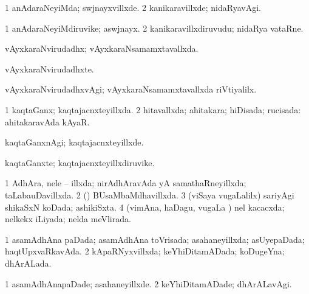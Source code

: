 {\bentry
{} 
\gl{\kirxvi}
\expl{}
\bmng
\bnum
\num{1} anAdaraNeyiMda; swjnayxvillxde. 
\num{2} kanikaravillxde; nidaRyavAgi. 
\enum
\emng
\eentry

\bentry
{} 
\gl{\nA}
\expl{}
\bmng
\bnum
\num{1} anAdaraNeyiMdiruvike; aswjnayx. 
\num{2} kanikaravillxdiruvudu; nidaRya vataRne. 
\enum
\emng
\eentry

\bentry
{} 
\gl{\gu}
\expl{}
\bmng
 vAyxkaraNvirudadhx; vAyxkaraNsamamxtavallxda. 
\emng
\eentry

\bentry
{} 
\gl{\nA}
\expl{}
\bmng
 vAyxkaraNvirudadhxte. 
\emng
\eentry

\bentry
{} 
\gl{\kirxvi}
\expl{}
\bmng
 vAyxkaraNvirudadhxvAgi; vAyxkaraNsamamxtavallxda riVtiyalilx. 
\emng
\eentry

\bentry
{} 
\gl{\nA}
\expl{}
\bmng
\emng
\eentry

\bentry
{} 
\gl{\gu}
\expl{}
\bmng
\bnum
\num{1} kaqtaGanx; kaqtajacnxteyillxda. 
\num{2} hitavallxda; ahitakara; hiDisada; rucisada:  ahitakaravAda kAyaR. 
\enum
\emng
\eentry

\bentry
{} 
\gl{\kirxvi}
\expl{}
\bmng
 kaqtaGanxnAgi; kaqtajacnxteyillxde. 
\emng
\eentry

\bentry
{} 
\gl{\nA}
\expl{}
\bmng
 kaqtaGanxte; kaqtajacnxteyillxdiruvike. 
\emng
\eentry

\bentry
{} 
\gl{\gu}
\expl{}
\bmng
\bnum
\num{1} AdhAra, nele -- illxda; nirAdhAravAda yA samathaRneyillxda; taLabauDavillxda. 
\num{2} (\viduyx) BUsaMbaMdhavillxda. 
\num{3} (viSaya \mo vugaLalilx) sariyAgi shikaSxN koDada; ashikiSxta. 
\num{4} (vimAna, haDagu, \mo vugaLa \vi) nel kacacxda; nelkekx iLiyada; nelda meVlirada. 
\enum
\emng
\eentry

\bentry
{} 
\gl{\gu}
\expl{}
\bmng
\bnum
\num{1} asamAdhAna paDada; asamAdhAna toVrisada; asahaneyillxda; asUyepaDada; haqtUpxvaRkavAda. 
\num{2} kApaRNyxvillxda; keYhiDitamADada; koDugeYna; dhArALada. 
\enum
\emng
\eentry

\bentry
{} 
\gl{\kirxvi}
\expl{}
\bmng
\bnum
\num{1} asamAdhAnapaDade; asahaneyillxde. 
\num{2} keYhiDitamADade; dhArALavAgi. 
\enum
\emng
\eentry

}
